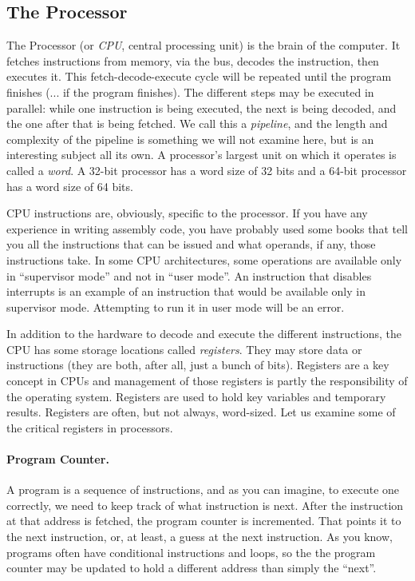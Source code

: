 \subsection*{The Processor}

The Processor (or \textit{CPU}, central processing unit) is the brain of the computer. It fetches instructions from memory, via the bus, decodes the instruction, then executes it. This fetch-decode-execute cycle will be repeated until the program finishes (... if the program finishes). The different steps may be executed in parallel: while one instruction is being executed, the next is being decoded, and the one after that is being fetched. We call this a \textit{pipeline}, and the length and complexity of the pipeline is something we will not examine here, but is an interesting subject all its own. A processor's largest unit on which it operates is called a \textit{word}. A 32-bit processor has a word size of 32 bits and a 64-bit processor has a word size of 64 bits.

CPU instructions are, obviously, specific to the processor. If you have any experience in writing assembly code, you have probably used some books that tell you all the instructions that can be issued and what operands, if any, those instructions take. In some CPU architectures, some operations are available only in ``supervisor mode'' and not in ``user mode''. An instruction that disables interrupts is an example of an instruction that would be available only in supervisor mode. Attempting to run it in user mode will be an error.

In addition to the hardware to decode and execute the different instructions, the CPU has some storage locations called \textit{registers}. They may store data or instructions (they are both, after all, just a bunch of bits). Registers are a key concept in CPUs and management of those registers is partly the responsibility of the operating system. Registers are used to hold key variables and temporary results. Registers are often, but not always, word-sized. Let us examine some of the critical registers in processors.

\paragraph{Program Counter.} A program is a sequence of instructions, and as you can imagine, to execute one correctly, we need to keep track of what instruction is next. After the instruction at that address is fetched, the program counter is incremented. That points it to the next instruction, or, at least, a guess at the next instruction. As you know, programs often have conditional instructions and loops, so the the program counter may be updated to hold a different address than simply the ``next''.

